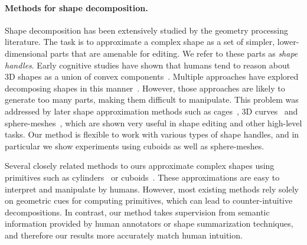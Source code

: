 \paragraph*{Methods for shape decomposition.}
Shape decomposition has been extensively studied by the geometry processing
literature. The task is to approximate a complex shape as a set of simpler, lower-dimensional
parts that are amenable for editing. We refer to these parts as \emph{shape handles}. Early cognitive studies have shown that humans tend to reason about 3D shapes as a union
of convex components~\cite{partsrecognition}. Multiple approaches have explored decomposing shapes in this manner~\cite{acd, minimumncd, acanalysis}.
However, those approaches are likely to generate too many parts, making them difficult to manipulate.
This problem was addressed by later shape approximation methods such as cages~\cite{obbcage}, 3D curves~\cite{gsmc_iwires_sig_09,mzlsgm_abstraction_siga_09,Gori2017}
and sphere-meshes~\cite{spheremesh}, which are shown very useful in shape editing and other high-level tasks. Our method is flexible to work with various types of shape handles, and in particular we show experiments using cuboids as well as sphere-meshes.

Several closely related methods to ours approximate complex shapes using
primitives such as cylinders~\cite{gdc} or cuboids~\cite{obbcage}.
These approximations are easy to interpret and manipulate
by humans. However, most existing methods rely solely on geometric cues for computing primitives, which
can lead to counter-intuitive decompositions.
In contrast, our method takes supervision from semantic information provided
by human annotators or shape summarization techniques, 
and therefore our results more accurately match human intuition. 


